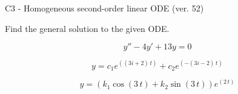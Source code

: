 \begin{exercise}
  \begin{exerciseTitle}C3 - Homogeneous second-order linear ODE (ver. 52)\end{exerciseTitle}
  \begin{exerciseStatement}
    
Find the general solution to the given ODE.

    
\[y''-4y'+13y = 0\]

  \end{exerciseStatement}
  \begin{exerciseAnswer}
    
\[y= c_{1} e^{\left(\left(3 i + 2\right) \, t\right)} + c_{2} e^{\left(-\left(3 i - 2\right) \, t\right)}\]

    
\[y= {\left(k_{1} \cos\left(3 \, t\right) + k_{2} \sin\left(3 \, t\right)\right)} e^{\left(2 \, t\right)}\]

  \end{exerciseAnswer}
\end{exercise}